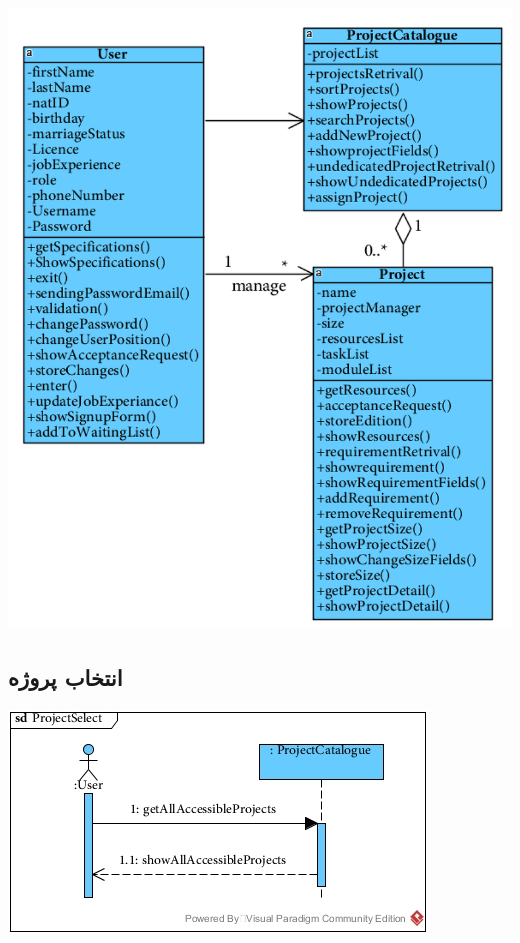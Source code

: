\newpage
\vspace{2cm}
\begin{center}
\includegraphics[width=\textwidth]{SequenceClasses/39.png}
\end{center}


\newpage
\vspace{2cm}
\subsection*{انتخاب پروژه}
\vspace{2cm}
\begin{center}
\includegraphics[width=\textwidth]{SequenceDiagrams/Extera_1.jpg}
\end{center}



